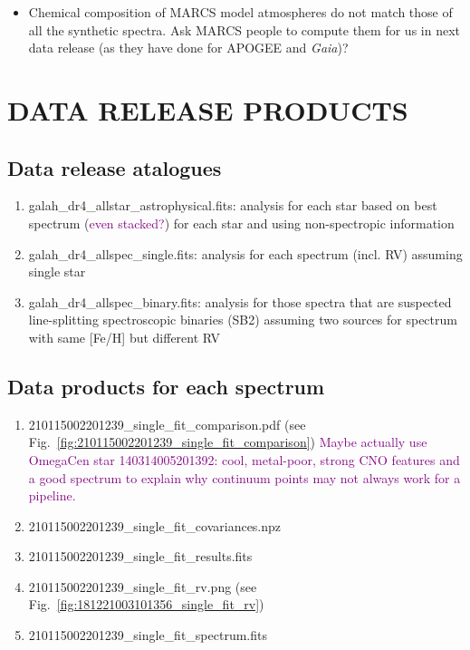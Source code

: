 \documentclass[
  journal=pasa,
  manuscript=research-paper, %
  year=2021,
  volume=37
]{cup-journal}
\newcommand{\SB}[1]{{\textcolor{purple}{#1}}}
\newcommand{\Gaia}{\textit{Gaia}\xspace}
\begin{document}
\begin{itemize}
    \item Chemical composition of \textsc{MARCS} model atmospheres do not match those of all the synthetic spectra. Ask \textsc{MARCS} people to compute them for us in next data release (as they have done for APOGEE and \Gaia)?
\end{itemize}

\newpage
\section{DATA RELEASE PRODUCTS}
\label{sec:catalogues_release_products}

\subsection{Data release atalogues}

\begin{enumerate}
    \item galah\_dr4\_allstar\_astrophysical.fits: analysis for each star based on best spectrum (\SB{even stacked?}) for each star and using non-spectropic information
    \item galah\_dr4\_allspec\_single.fits: analysis for each spectrum (incl. RV) assuming single star
    \item galah\_dr4\_allspec\_binary.fits: analysis for those spectra that are suspected line-splitting spectroscopic binaries (SB2) assuming two sources for spectrum with same [Fe/H] but different RV
\end{enumerate}

\subsection{Data products for each spectrum}
\label{sec:data_products_for_each_spectrum}

\begin{enumerate}
    \item 210115002201239\_single\_fit\_comparison.pdf (see Fig.~\ref{fig:210115002201239_single_fit_comparison}) \SB{Maybe actually use OmegaCen star 140314005201392: cool, metal-poor, strong CNO features and a good spectrum to explain why continuum points may not always work for a pipeline.}
    \item 210115002201239\_single\_fit\_covariances.npz
    \item 210115002201239\_single\_fit\_results.fits
    \item 210115002201239\_single\_fit\_rv.png (see Fig.~\ref{fig:181221003101356_single_fit_rv})
    \item 210115002201239\_single\_fit\_spectrum.fits
\end{enumerate}
\end{document}
